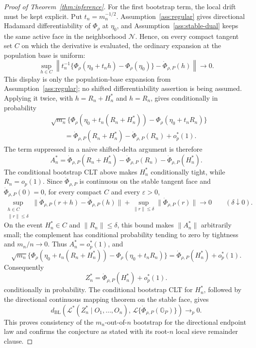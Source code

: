 \documentclass[11pt]{article}
\theoremstyle{definition}
\theoremstyle{plain}
\theoremstyle{remark}
\begin{document}
\begin{proof}[Proof of Theorem~\ref{thm:inference}]
For the first bootstrap term, the local drift must be kept explicit.  Put \(t_n=m_n^{-1/2}\).  Assumption~\ref{ass:regular} gives directional Hadamard differentiability of \(\Phi_\rho\) at \(\eta_0\), and Assumption~\ref{ass:stable-dual} keeps the same active face in the neighborhood \(\mathcal N\).  Hence, on every compact tangent set \(C\) on which the derivative is evaluated, the ordinary expansion at the population base is uniform:
\[
\sup_{h\in C}
\left\|t_n^{-1}\{\Phi_\rho(\eta_0+t_n h)-\Phi_\rho(\eta_0)\}
-\dot\Phi_{\rho,P}(h)\right\|\to0 .
\]
This display is only the population-base expansion from Assumption~\ref{ass:regular}; no shifted differentiability assertion is being assumed.  Applying it twice, with \(h=R_n+H_n^*\) and \(h=R_n\), gives conditionally in probability
\[
\begin{aligned}
&\sqrt{m_n}\{\Phi_\rho(\eta_0+t_n(R_n+H_n^*))
-\Phi_\rho(\eta_0+t_nR_n)\}\\
&\qquad =
\dot\Phi_{\rho,P}(R_n+H_n^*)-\dot\Phi_{\rho,P}(R_n)+o_p^*(1).
\end{aligned}
\]
The term suppressed in a naive shifted-delta argument is therefore
\[
A_n^*=
\dot\Phi_{\rho,P}(R_n+H_n^*)-\dot\Phi_{\rho,P}(R_n)
-\dot\Phi_{\rho,P}(H_n^*).
\]
The conditional bootstrap CLT above makes \(H_n^*\) conditionally tight, while \(R_n=o_p(1)\).  Since \(\dot\Phi_{\rho,P}\) is continuous on the stable tangent face and \(\dot\Phi_{\rho,P}(0)=0\), for every compact \(C\) and every \(\varepsilon>0\),
\[
\sup_{\substack{h\in C\\ \|r\|\le\delta}}
\|\dot\Phi_{\rho,P}(r+h)-\dot\Phi_{\rho,P}(h)\|
+\sup_{\|r\|\le\delta}\|\dot\Phi_{\rho,P}(r)\|
\to0
\qquad(\delta\downarrow0).
\]
On the event \(H_n^*\in C\) and \(\|R_n\|\le\delta\), this bound makes \(\|A_n^*\|\) arbitrarily small; the complement has conditional probability tending to zero by tightness and \(m_n/n\to0\).  Thus \(A_n^*=o_p^*(1)\), and
\[
\sqrt{m_n}\{\Phi_\rho(\eta_0+t_n(R_n+H_n^*))
-\Phi_\rho(\eta_0+t_nR_n)\}
=\dot\Phi_{\rho,P}(H_n^*)+o_p^*(1).
\]
Consequently
\[
Z_n^*
=\dot\Phi_{\rho,P}(H_n^*)+o_p^*(1).
\]
conditionally in probability. The conditional bootstrap CLT for \(H_n^*\), followed by the directional continuous mapping theorem on the stable face, gives
\[
d_{\mathrm{BL}}\!\left(\mathcal L^*(Z_n^*\mid O_1,\ldots,O_n),\,
\mathcal L\{\dot\Phi_{\rho,P}(\mathbb G_P)\}\right)\to_p0.
\]
This proves consistency of the \(m_n\)-out-of-\(n\) bootstrap for the directional endpoint law and confirms the conjecture as stated with its root-\(n\) local sieve remainder clause.
\end{proof}
\end{document}
